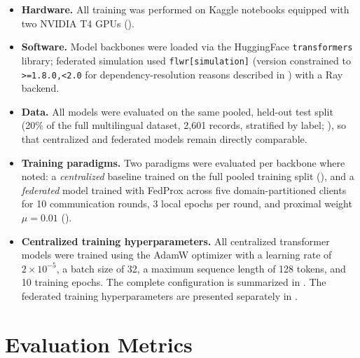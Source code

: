 \begin{itemize}
    \item \textbf{Hardware.} All training was performed on Kaggle notebooks equipped with two NVIDIA T4 GPUs ().
    \item \textbf{Software.} Model backbones were loaded via the HuggingFace \texttt{transformers} library; federated simulation used \texttt{flwr[simulation]} (version constrained to \texttt{>=1.8.0,<2.0} for dependency-resolution reasons described in ) with a Ray backend.
    \item \textbf{Data.} All models were evaluated on the same pooled, held-out test split (20\% of the full multilingual dataset, 2{,}601 records, stratified by label; ), so that centralized and federated models remain directly comparable.
    \item \textbf{Training paradigms.} Two paradigms were evaluated per backbone where noted: a \emph{centralized} baseline trained on the full pooled training split (), and a \emph{federated} model trained with FedProx across five domain-partitioned clients for 10 communication rounds, 3 local epochs per round, and proximal weight $\mu = 0.01$ ().
\item \textbf{Centralized training hyperparameters.} All centralized transformer models were trained using the AdamW optimizer with a learning rate of $2 \times 10^{-5}$, a batch size of 32, a maximum sequence length of 128 tokens, and 10 training epochs. The complete configuration is summarized in . The federated training hyperparameters are presented separately in .
\end{itemize}

\section{Evaluation Metrics}
\label{sec:metrics-recap}


